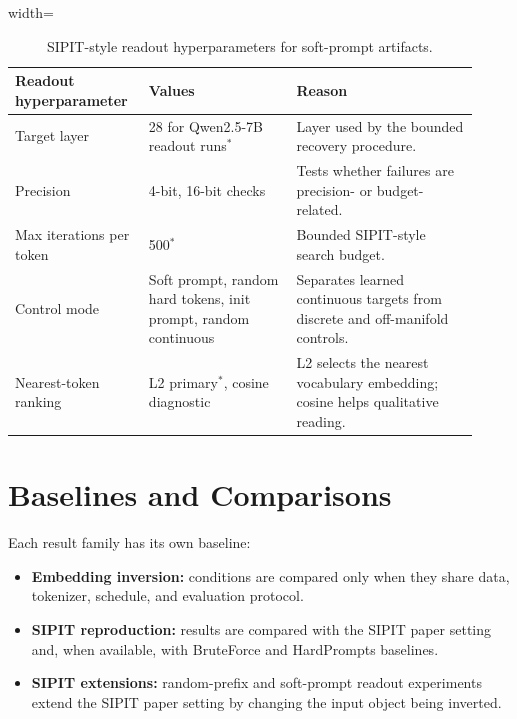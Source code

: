 \documentclass[12pt,a4paper,twoside,openright]{book}
\begin{document}
\begin{table}[!htb]
    \centering
    \scriptsize
    \begin{adjustbox}{width=\textwidth}
    \begin{tabular}{p{0.25\linewidth} p{0.30\linewidth} p{0.37\linewidth}}
        \toprule
        \textbf{Readout hyperparameter} & \textbf{Values} & \textbf{Reason} \\
        \midrule
        Target layer &
        28 for Qwen2.5-7B readout runs$^*$ &
        Layer used by the bounded recovery procedure. \\
        Precision &
        4-bit, 16-bit checks &
        Tests whether failures are precision- or budget-related. \\
        Max iterations per token &
        500$^*$ &
        Bounded SIPIT-style search budget. \\
        Control mode &
        Soft prompt, random hard tokens, init prompt, random continuous &
        Separates learned continuous targets from discrete and off-manifold controls. \\
        Nearest-token ranking &
        L2 primary$^*$, cosine diagnostic &
        L2 selects the nearest vocabulary embedding; cosine helps qualitative reading. \\
        \bottomrule
    \end{tabular}
    \end{adjustbox}
    \caption{SIPIT-style readout hyperparameters for soft-prompt artifacts.}
    \label{tab:sipit-readout-hyperparameters}
\end{table}

\section{Baselines and Comparisons}
\label{sec:setup-baselines}

Each result family has its own baseline:
\begin{itemize}
    \item \textbf{Embedding inversion:} conditions are compared only when they
    share data, tokenizer, schedule, and evaluation protocol.
    \item \textbf{SIPIT reproduction:} results are compared with the SIPIT paper
    setting and, when available, with BruteForce and HardPrompts baselines.
    \item \textbf{SIPIT extensions:} random-prefix and soft-prompt readout
    experiments extend the SIPIT paper setting by changing the input object
    being inverted.
\end{itemize}
\end{document}
